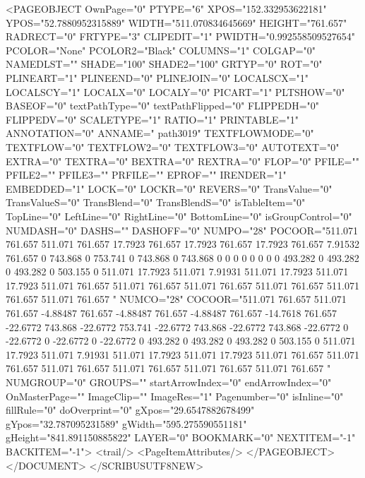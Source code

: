         <PAGEOBJECT OwnPage="0" PTYPE="6" XPOS="152.332953622181" YPOS="52.7880952315889" WIDTH="511.070834645669" HEIGHT="761.657" RADRECT="0" FRTYPE="3" CLIPEDIT="1" PWIDTH="0.992558509527654" PCOLOR="None" PCOLOR2="Black" COLUMNS="1" COLGAP="0" NAMEDLST="" SHADE="100" SHADE2="100" GRTYP="0" ROT="0" PLINEART="1" PLINEEND="0" PLINEJOIN="0" LOCALSCX="1" LOCALSCY="1" LOCALX="0" LOCALY="0" PICART="1" PLTSHOW="0" BASEOF="0" textPathType="0" textPathFlipped="0" FLIPPEDH="0" FLIPPEDV="0" SCALETYPE="1" RATIO="1" PRINTABLE="1" ANNOTATION="0" ANNAME=" path3019" TEXTFLOWMODE="0" TEXTFLOW="0" TEXTFLOW2="0" TEXTFLOW3="0" AUTOTEXT="0" EXTRA="0" TEXTRA="0" BEXTRA="0" REXTRA="0" FLOP="0" PFILE="" PFILE2="" PFILE3="" PRFILE="" EPROF="" IRENDER="1" EMBEDDED="1" LOCK="0" LOCKR="0" REVERS="0" TransValue="0" TransValueS="0" TransBlend="0" TransBlendS="0" isTableItem="0" TopLine="0" LeftLine="0" RightLine="0" BottomLine="0" isGroupControl="0" NUMDASH="0" DASHS="" DASHOFF="0" NUMPO="28" POCOOR="511.071 761.657 511.071 761.657 17.7923 761.657 17.7923 761.657 17.7923 761.657 7.91532 761.657 0 743.868 0 753.741 0 743.868 0 743.868 0 0 0 0 0 0 0 0 493.282 0 493.282 0 493.282 0 503.155 0 511.071 17.7923 511.071 7.91931 511.071 17.7923 511.071 17.7923 511.071 761.657 511.071 761.657 511.071 761.657 511.071 761.657 511.071 761.657 511.071 761.657 " NUMCO="28" COCOOR="511.071 761.657 511.071 761.657 -4.88487 761.657 -4.88487 761.657 -4.88487 761.657 -14.7618 761.657 -22.6772 743.868 -22.6772 753.741 -22.6772 743.868 -22.6772 743.868 -22.6772 0 -22.6772 0 -22.6772 0 -22.6772 0 493.282 0 493.282 0 493.282 0 503.155 0 511.071 17.7923 511.071 7.91931 511.071 17.7923 511.071 17.7923 511.071 761.657 511.071 761.657 511.071 761.657 511.071 761.657 511.071 761.657 511.071 761.657 " NUMGROUP="0" GROUPS="" startArrowIndex="0" endArrowIndex="0" OnMasterPage="" ImageClip="" ImageRes="1" Pagenumber="0" isInline="0" fillRule="0" doOverprint="0" gXpos="29.6547882678499" gYpos="32.787095231589" gWidth="595.275590551181" gHeight="841.891150885822" LAYER="0" BOOKMARK="0" NEXTITEM="-1" BACKITEM="-1">
            <trail/>
            <PageItemAttributes/>
        </PAGEOBJECT>
    </DOCUMENT>
</SCRIBUSUTF8NEW>